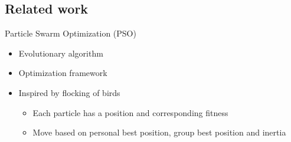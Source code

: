 \documentclass[11pt,t]{beamer}
\begin{document}
\subsection{Related work}
\begin{frame}{Particle Swarm Optimization (PSO)}
\begin{itemize}
	\item Evolutionary algorithm
	\item Optimization framework
	\item Inspired by flocking of birds
	\begin{itemize}
		\item Each particle has a position and corresponding fitness
		\item Move based on personal best position, group best position and inertia 
	\end{itemize}
\end{itemize}
	      
\begin{figure}
\centering
\scalebox{0.5}{%
\begin{tikzpicture}[x=0.75pt,y=0.75pt,yscale=-1,xscale=1]



\end{tikzpicture}}
\end{figure}
\end{frame}
\end{document}
